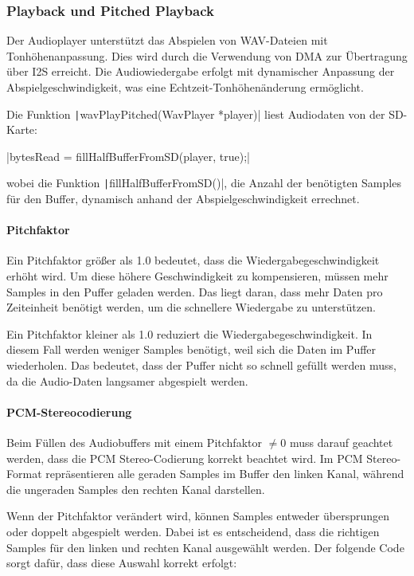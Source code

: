 \subsubsection{Playback und Pitched Playback}

Der Audioplayer unterstützt das Abspielen von WAV-Dateien mit Tonhöhenanpassung. Dies wird durch die Verwendung von DMA zur Übertragung über I2S erreicht. Die Audiowiedergabe erfolgt mit dynamischer Anpassung der Abspielgeschwindigkeit, was eine Echtzeit-Tonhöhenänderung ermöglicht.

Die Funktion \texttt|wavPlayPitched(WavPlayer *player)| liest Audiodaten von der SD-Karte:

|bytesRead = fillHalfBufferFromSD(player, true);|

wobei die Funktion \texttt|fillHalfBufferFromSD()|, die Anzahl der benötigten Samples für den Buffer, dynamisch anhand der Abspielgeschwindigkeit errechnet.

\paragraph{Pitchfaktor}

Ein Pitchfaktor größer als 1.0 bedeutet, dass die Wiedergabegeschwindigkeit erhöht wird. Um diese höhere Geschwindigkeit zu kompensieren, müssen mehr Samples in den Puffer geladen werden. Das liegt daran, dass mehr Daten pro Zeiteinheit benötigt werden, um die schnellere Wiedergabe zu unterstützen.

Ein Pitchfaktor kleiner als 1.0 reduziert die Wiedergabegeschwindigkeit. In diesem Fall werden weniger Samples benötigt, weil sich die Daten im Puffer wiederholen. Das bedeutet, dass der Puffer nicht so schnell gefüllt werden muss, da die Audio-Daten langsamer abgespielt werden.

\paragraph{PCM-Stereocodierung}

Beim Füllen des Audiobuffers mit einem Pitchfaktor \( \neq 0 \) muss darauf geachtet werden, dass die PCM Stereo-Codierung korrekt beachtet wird. 
Im PCM Stereo-Format repräsentieren alle geraden Samples im Buffer den linken Kanal, während die ungeraden Samples den rechten Kanal darstellen.

Wenn der Pitchfaktor verändert wird, können Samples entweder übersprungen oder doppelt abgespielt werden. Dabei ist es entscheidend, dass die richtigen Samples für den linken und rechten Kanal ausgewählt werden. Der folgende Code sorgt dafür, dass diese Auswahl korrekt erfolgt:

